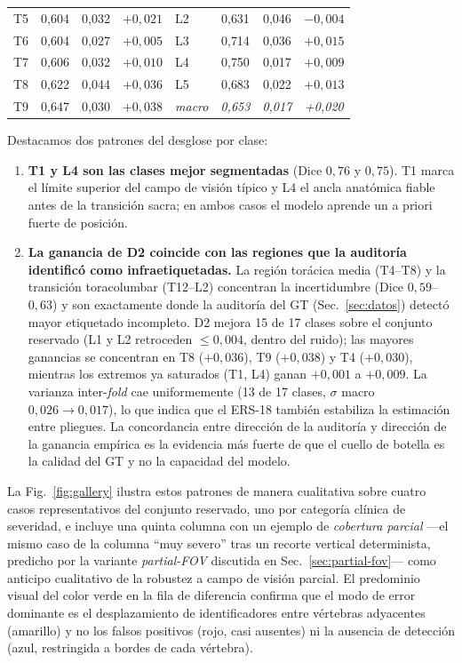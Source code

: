 \documentclass[conference]{IEEEtran}
\begin{document}
\begin{table}[htbp]
\begin{center}
\begin{tabular}{@{}lccc|lccc@{}}
T5  & 0{,}604 & 0{,}032 & $+0{,}021$ & L2            & 0{,}631      & 0{,}046      & $-0{,}004$ \\
T6  & 0{,}604 & 0{,}027 & $+0{,}005$ & L3            & 0{,}714      & 0{,}036      & $+0{,}015$ \\
T7  & 0{,}606 & 0{,}032 & $+0{,}010$ & L4            & 0{,}750      & 0{,}017      & $+0{,}009$ \\
T8  & 0{,}622 & 0{,}044 & $+0{,}036$ & L5            & 0{,}683      & 0{,}022      & $+0{,}013$ \\
T9  & 0{,}647 & 0{,}030 & $+0{,}038$ & \emph{macro}  & \emph{0,653} & \emph{0,017} & \emph{+0,020} \\
\bottomrule
\end{tabular}
\end{center}
\end{table}

Destacamos dos patrones del desglose por clase:
\begin{enumerate}
\item \textbf{T1 y L4 son las clases mejor segmentadas} (Dice $0{,}76$ y $0{,}75$). T1 marca el límite superior del campo de visión típico y L4 el ancla anatómica fiable antes de la transición sacra; en ambos casos el modelo aprende un a priori fuerte de posición.
\item \textbf{La ganancia de D2 coincide con las regiones que la auditoría identificó como infraetiquetadas.} La región torácica media (T4--T8) y la transición toracolumbar (T12--L2) concentran la incertidumbre (Dice $0{,}59$--$0{,}63$) y son exactamente donde la auditoría del GT (Sec.~\ref{sec:datos}) detectó mayor etiquetado incompleto. D2 mejora 15 de 17 clases sobre el conjunto reservado (L1 y L2 retroceden $\leq 0{,}004$, dentro del ruido); las mayores ganancias se concentran en T8 ($+0{,}036$), T9 ($+0{,}038$) y T4 ($+0{,}030$), mientras los extremos ya saturados (T1, L4) ganan $+0{,}001$ a $+0{,}009$. La varianza inter-\emph{fold} cae uniformemente (13 de 17 clases, $\sigma$ macro $0{,}026 \rightarrow 0{,}017$), lo que indica que el ERS-18 también estabiliza la estimación entre pliegues. La concordancia entre dirección de la auditoría y dirección de la ganancia empírica es la evidencia más fuerte de que el cuello de botella es la calidad del GT y no la capacidad del modelo.
\end{enumerate}

La Fig.~\ref{fig:gallery} ilustra estos patrones de manera cualitativa sobre cuatro casos representativos del conjunto reservado, uno por categoría clínica de severidad, e incluye una quinta columna con un ejemplo de \emph{cobertura parcial} ---el mismo caso de la columna ``muy severo'' tras un recorte vertical determinista, predicho por la variante \emph{partial-FOV} discutida en Sec.~\ref{sec:partial-fov}--- como anticipo cualitativo de la robustez a campo de visión parcial. El predominio visual del color verde en la fila de diferencia confirma que el modo de error dominante es el desplazamiento de identificadores entre vértebras adyacentes (amarillo) y no los falsos positivos (rojo, casi ausentes) ni la ausencia de detección (azul, restringida a bordes de cada vértebra).
\end{document}

